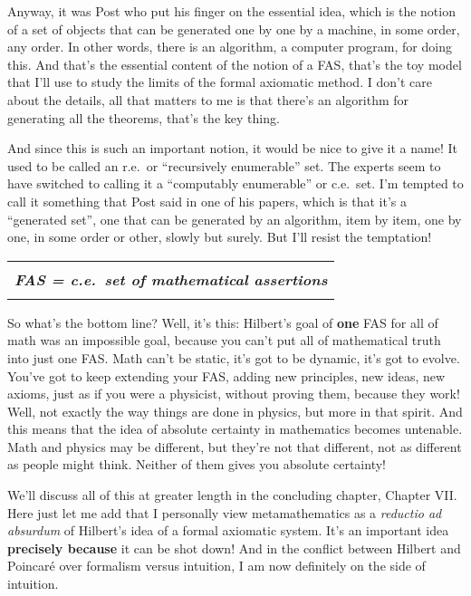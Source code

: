 \documentclass[12pt]{book}
\begin{document}
Anyway, it was Post who put his finger on the essential idea, which is the notion of
a set of objects that can be generated one by one by a machine, in some order, any order.
In other words, there is an algorithm, a computer program, for doing this.  
And that's the essential content
of the notion of a FAS, that's the toy model that I'll use to study the limits of the
formal axiomatic method.  I don't care about the details, all that matters to me is that
there's an algorithm for generating all the theorems, that's the key thing.

And since this is such an important notion, it would be nice to give it a name!
It used to be called an r.e.\ or ``recursively enumerable'' set.  The experts seem to
have switched to calling it a ``computably enumerable'' or c.e.\ set.  
I'm tempted to call it something
that Post said in one of his papers, which is that it's a ``generated set'',
one that can be generated by an algorithm, item by item, one by one, in some order or other,
slowly but surely. 
But I'll resist the temptation!

\begin{center}
\begin{tabular}{|c|}
\hline
\\
\textbf{\emph{\large FAS = c.e.\ set of mathematical assertions}}
\\
\\
\hline
\end{tabular}
\end{center}

So what's the bottom line? Well, it's this:
Hilbert's goal of \textbf{one} FAS for all of math
was an impossible goal, because you can't put all of mathematical truth into
just one FAS. Math can't be static, it's got to be dynamic, it's got to evolve.
You've got to keep extending your FAS, adding new principles, new ideas, new axioms,
just as if you were a physicist, without proving them, because they work!
Well, not exactly the way things are done in physics, but more in that spirit.
And this means that the idea of absolute certainty in mathematics becomes untenable.
Math and physics may be different,
but they're not that different, not as
different as people might think.
Neither of them gives you absolute certainty!

We'll discuss all of this at greater length in the concluding chapter, Chapter VII.
Here just let me add that I personally view metamathematics as a \emph{reductio ad absurdum}
of Hilbert's idea of a formal axiomatic system.  
It's an important idea \textbf{precisely because} it can be shot down!
And in the conflict between Hilbert and Poincar\'e over formalism versus intuition,
I am now definitely on the side of intuition.
\end{document}
